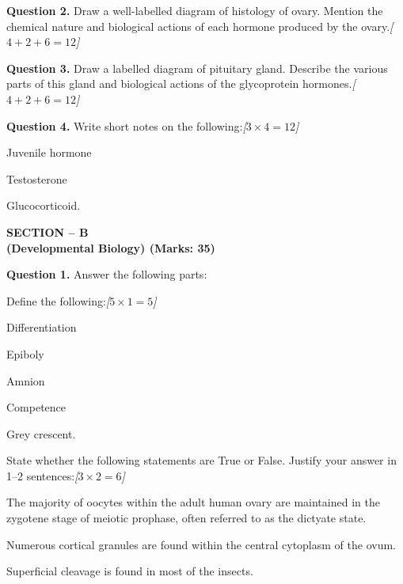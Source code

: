 \documentclass[11pt,a4paper]{article}
\newcommand{\pts}[1]{\hfill   \textit{[#1]}}
\begin{document}
\medskip


\noindent   \textbf{Question 2.} Draw a well-labelled diagram of histology of ovary. Mention the chemical nature and biological actions of each hormone produced by the ovary.\pts{$4 + 2 + 6 = 12$}

\medskip


\noindent   \textbf{Question 3.} Draw a labelled diagram of pituitary gland. Describe the various parts of this gland and biological actions of the glycoprotein hormones.\pts{$4 + 2 + 6 = 12$}

\medskip


\noindent   \textbf{Question 4.} Write short notes on the following:\pts{$3  \times 4 = 12$}

\begin{parts}
  \item Juvenile hormone
  \item Testosterone
  \item Glucocorticoid.
\end{parts}

\pagebreak

\begin{center}
   \textbf{SECTION -- B} \\
   \textbf{(Developmental Biology) (Marks: 35)}
\end{center}

\medskip


\noindent   \textbf{Question 1.} Answer the following parts:

\begin{parts}
  \item Define the following:\pts{$5  \times 1 = 5$}
  
\begin{parts}
    \item Differentiation
    \item Epiboly
    \item Amnion
    \item Competence
    \item Grey crescent.
  \end{parts}
  
  \item State whether the following statements are True or False. Justify your answer in 1--2 sentences:\pts{$3  \times 2 = 6$}
  
\begin{parts}
    \item The majority of oocytes within the adult human ovary are maintained in the zygotene stage of meiotic prophase, often referred to as the dictyate state.
    \item Numerous cortical granules are found within the central cytoplasm of the ovum.
    \item Superficial cleavage is found in most of the insects.
  \end{parts}
\end{parts}
\end{document}
